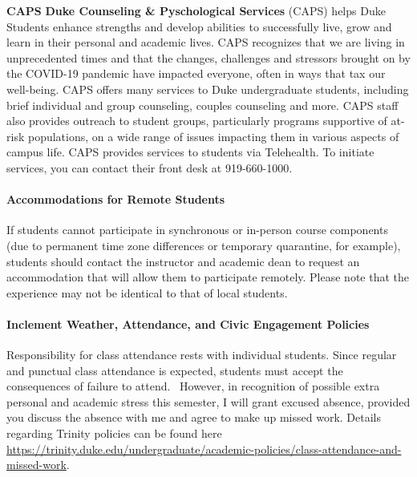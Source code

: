 \documentclass[11pt]{article}
\begin{document}
\textbf{CAPS}
\textbf{Duke Counseling \& Pyschological Services} (CAPS) helps Duke Students enhance strengths and develop abilities to successfully live, grow and learn in their personal and academic lives. CAPS recognizes that we are living in unprecedented times and that the changes, challenges and stressors brought on by the COVID-19 pandemic have impacted everyone, often in ways that tax our well-being. CAPS offers many services to Duke undergraduate students, including brief individual and group counseling, couples counseling and more. CAPS staff also provides outreach to student groups, particularly programs supportive of at-risk populations, on a wide range of issues impacting them in various aspects of campus life. CAPS provides services to students via Telehealth. To initiate services, you can contact their front desk at 919-660-1000.\\

%

\paragraph{Accommodations for Remote Students}
If students cannot participate in synchronous or in-person course components (due to permanent time zone differences or temporary quarantine, for example), students should contact the instructor and academic dean to request an accommodation that will allow them to participate remotely. Please note that the experience may not be identical to that of local students.\\

\paragraph{Inclement Weather, Attendance, and Civic Engagement Policies}
Responsibility for class attendance rests with individual students. Since regular and punctual class attendance is expected, students must accept the consequences of failure to attend.  However, in recognition of possible extra personal and academic stress this semester, I will grant excused absence, provided you discuss the absence with me and agree to make up missed work. Details regarding Trinity policies can be found here \url{https://trinity.duke.edu/undergraduate/academic-policies/class-attendance-and-missed-work}. \\
\end{document}
